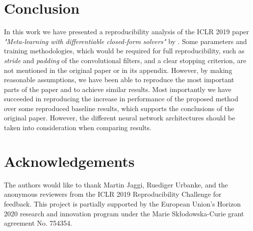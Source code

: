 \section{Conclusion}
\label{conc}
In this work we have presented a reproducibility analysis of the ICLR 2019 paper \textit{"Meta-learning with differentiable closed-form solvers"} by \citet{R2D2}. Some parameters and training methodologies, which would be required for full reproducibility, such as \textit{stride} and \textit{padding} of the convolutional filters, and a clear stopping criterion, are not mentioned in the original paper or in its appendix\supercite{R2D2}. However, by making reasonable assumptions, we have been able to reproduce the most important parts of the paper and to achieve similar results. Most importantly we have succeeded in reproducing the increase in performance of the proposed method over some reproduced baseline results, which supports the conclusions of the original paper. However, the different neural network architectures should be taken into consideration when comparing results.
\section*{Acknowledgements}
The authors would like to thank Martin Jaggi, Ruediger Urbanke, and the anonymous reviewers from the ICLR 2019 Reproducibility Challenge for feedback. This project is partially supported by the European Union’s Horizon 2020 research and innovation program under the Marie Skłodowska-Curie grant agreement No. 754354.
